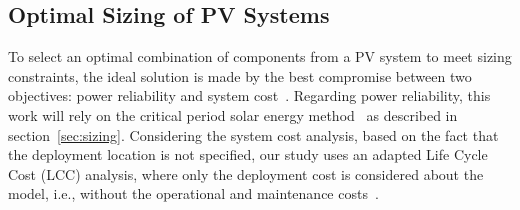 \documentclass[10pt,conference]{IEEEtran}
\begin{document}
\subsection{Optimal Sizing of PV Systems}
%
To select an optimal combination of components from a PV system to meet sizing constraints, 
the ideal solution is made by the best compromise between two objectives: power reliability and system cost~\cite{Alsadi2018}. 
Regarding power reliability, this work will rely on the critical period solar energy method~\cite{Pinho} as described in section~\ref{sec:sizing}. 
Considering the system cost analysis, based on the fact that the deployment location is not specified, our study uses an adapted Life Cycle Cost (LCC) analysis, where only the deployment cost is considered about the model, i.e., without the operational and maintenance costs~\cite{Alsadi2018}.
\end{document}
